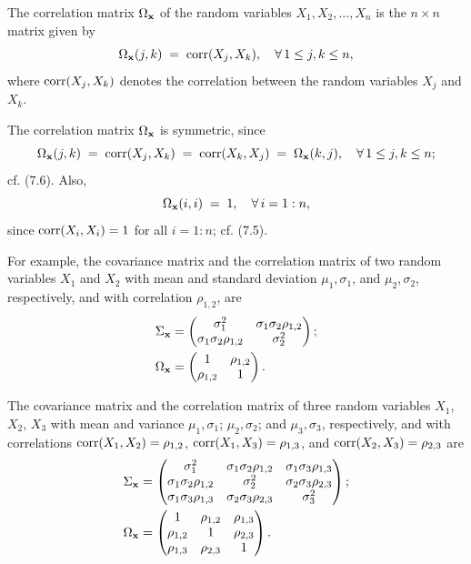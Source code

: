 \begin{definition}
The correlation matrix $\Omega_{\bfx}$ of the random variables $X_1, X_2, \ldots,
X_n$ is the $n \times n$ matrix given by
\[
\Omega_{\bfx}(j,k) \;=\; \corr(X_j,X_k), \quad \forall\, 1\le j,k\le n,
\]
where $\corr(X_j,X_k)$ denotes the correlation between the random variables $X_j$ and
$X_k$.
\end{definition}

The correlation matrix $\Omega_{\bfx}$ is symmetric, since
\begin{equation}
\Omega_{\bfx}(j,k) \;=\; \corr(X_j,X_k) \;=\; \corr(X_k,X_j) \;=\; \Omega_{\bfx}(k,j), \quad \forall\, 1\le j,k\le n;
\end{equation}
cf. (7.6). Also,
\begin{equation}
\Omega_{\bfx}(i,i) \;=\; 1, \quad \forall\, i = 1:n,
\end{equation}
since $\corr(X_i,X_i) = 1$ for all $i = 1:n$; cf. (7.5).

For example, the covariance matrix and the correlation matrix of two random variables
$X_1$ and $X_2$ with mean and standard deviation $\mu_1, \sigma_1$, and $\mu_2,
\sigma_2$, respectively, and with correlation $\rho_{1,2}$, are
\begin{align}
\Sigma_{\bfx} &= \begin{pmatrix} \sigma_1^2 & \sigma_1\sigma_2\rho_{1,2} \\ \sigma_1\sigma_2\rho_{1,2} & \sigma_2^2 \end{pmatrix}; \\
\Omega_{\bfx} &= \begin{pmatrix} 1 & \rho_{1,2} \\ \rho_{1,2} & 1 \end{pmatrix}.
\end{align}

The covariance matrix and the correlation matrix of three random variables $X_1$,
$X_2$, $X_3$ with mean and variance $\mu_1, \sigma_1$; $\mu_2, \sigma_2$; and $\mu_3,
\sigma_3$, respectively, and with correlations $\corr(X_1,X_2) = \rho_{1,2}$,
$\corr(X_1,X_3) = \rho_{1,3}$, and $\corr(X_2,X_3) = \rho_{2,3}$ are
\begin{align}
\Sigma_{\bfx} &= \begin{pmatrix}
\sigma_1^2 & \sigma_1\sigma_2\rho_{1,2} & \sigma_1\sigma_3\rho_{1,3} \\
\sigma_1\sigma_2\rho_{1,2} & \sigma_2^2 & \sigma_2\sigma_3\rho_{2,3} \\
\sigma_1\sigma_3\rho_{1,3} & \sigma_2\sigma_3\rho_{2,3} & \sigma_3^2
\end{pmatrix}; \\
\Omega_{\bfx} &= \begin{pmatrix}
1 & \rho_{1,2} & \rho_{1,3} \\
\rho_{1,2} & 1 & \rho_{2,3} \\
\rho_{1,3} & \rho_{2,3} & 1
\end{pmatrix}.
\end{align}
